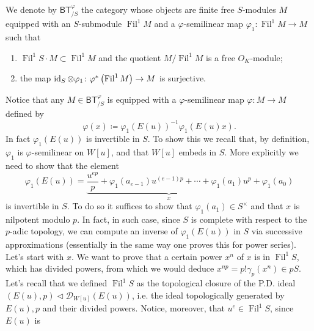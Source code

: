 \begin{defn}[]
	We denote by $\mathsf{BT}^{\varphi}_{/S}$ the category
	whose objects are finite free $S$-modules $M$
	equipped with an $S$-submodule $\operatorname{Fil}^1 M$
	and a $\varphi$-semilinear map $\varphi_1\colon  \operatorname{Fil}^1 M \to M$
	such that
\begin{enumerate}
	\item $\operatorname{Fil}^1 S \cdot M \subset \operatorname{Fil}^1 M$
		and the quotient $M/\operatorname{Fil}^1 M$ is a free $O_{ K }$-module;
	\item the map $\operatorname{id}_{ S } \otimes \varphi_1\colon 
		\varphi^* \left( \operatorname{Fil}^1 M \right) \to M$
		is surjective.
\end{enumerate}
\end{defn}


\begin{rem}[]\label{invertibilityphi1E(u))}
	Notice that any $M \in \mathsf{BT}^{\varphi}_{/S}$ is equipped with a 
	$\varphi$-semilinear map $\varphi\colon M \to M$ defined by
	\begin{equation*}
		\varphi (x) \coloneqq \varphi_1 \left( E(u) \right)^{-1} \varphi_1 (E(u)x)
	.\end{equation*}
	In fact $\varphi_1(E(u))$ is invertible in $S$.
	To show this we recall that, by definition, $\varphi_1$ is
	$\varphi$-semilinear on $W[u]$, and that $W[u]$ embeds in $S$.
	More explicitly we need to show that the element
	\begin{equation*}
		\varphi_1(E(u)) =
		\underbrace{\frac{ u^{ep} }{ p } + \varphi_1(a_{e-1}) u^{(e-1)p} +
		\cdots + \varphi_1(a_1)u^p}_{x} + \varphi_1(a_0)
	\end{equation*}
	is invertible in $S$.
	To do so it suffices to show that $\varphi_1(a_1) \in S^{\times}$ and
	that $x$ is nilpotent modulo $p$. 
	In fact, in such case, since $S$ is complete with respect to the
	$p$-adic topology, we can compute an inverse of $\varphi_1(E(u))$
	in $S$ via successive approximations (essentially in the same
	way one proves this for power series).
	Let's start with $x$.
	We want to prove that a certain power $x^n$ of $x$
	is in $\operatorname{Fil}^1S$, which has divided powers,
	from which we would deduce $x^{np} = p! \gamma_p(x^n) \in pS$.
	Let's recall that we defined $\operatorname{Fil}^1S$ as the topological
	closure of the P.D. ideal $(E(u),p) \triangleleft \mathcal{D}_{W[u]}(E(u))$,
	i.e. the ideal topologically generated by $E(u), p$ and their divided powers.
	Notice, moreover, that $u^e \in \operatorname{Fil}^1S$, since $E(u)$ is

\end{rem}
